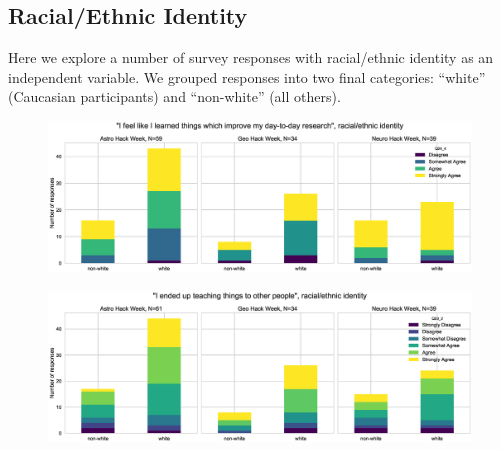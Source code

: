 \documentclass{aastex62}
\begin{document}
\clearpage

\subsection{Racial/Ethnic Identity}

Here we explore a number of survey responses with racial/ethnic identity as an independent variable. We grouped responses into two final categories: ``white'' (Caucasian participants) and ``non-white'' (all others).

\begin{figure}[h!]
\centering
\includegraphics[width=\textwidth]{Q24_4_Q30_stackedbars.eps}
\caption{}
\label{fig:corr9}
\end{figure}

\begin{figure}[h!]
\centering
\includegraphics[width=\textwidth]{Q23_2_Q30_stackedbars.eps}
\caption{}
\label{fig:corr10}
\end{figure}
\end{document}

